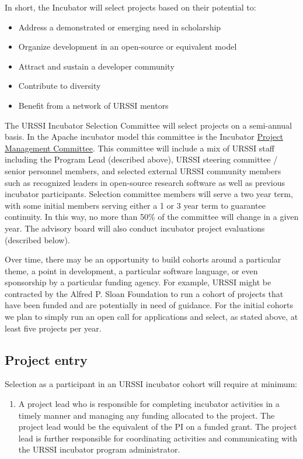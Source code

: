 \documentclass[
]{book}
\providecommand{\tightlist}{%
  \setlength{\itemsep}{0pt}\setlength{\parskip}{0pt}}
\begin{document}
In short, the Incubator will select projects based on their potential to:

\begin{itemize}
\tightlist
\item
  Address a demonstrated or emerging need in scholarship
\item
  Organize development in an open-source or equivalent model
\item
  Attract and sustain a developer community
\item
  Contribute to diversity
\item
  Benefit from a network of URSSI mentors
\end{itemize}

The URSSI Incubator Selection Committee will select projects on a semi-annual basis. In the Apache incubator model this committee is the Incubator \href{http://incubator.apache.org/whoweare.html}{Project Management Committee}.
This committee will include a mix of URSSI staff including the Program Lead (described above), URSSI steering committee / senior personnel members, and selected external URSSI community members such as recognized leaders in open-source research software as well as previous incubator participants.
Selection committee members will serve a two year term, with some initial members serving either a 1 or 3 year term to guarantee continuity.
In this way, no more than 50\% of the committee will change in a given year.
The advisory board will also conduct incubator project evaluations (described below).

Over time, there may be an opportunity to build cohorts around a particular theme, a point in development, a particular software language, or even sponsorship by a particular funding agency.
For example, URSSI might be contracted by the Alfred P. Sloan Foundation to run a cohort of projects that have been funded and are potentially in need of guidance.
For the initial cohorts we plan to simply run an open call for applications and select, as stated above, at least five projects per year.

\hypertarget{project-entry}{%
\subsection{Project entry}\label{project-entry}}

Selection as a participant in an URSSI incubator cohort will require at minimum:

\begin{enumerate}
\def\labelenumi{\arabic{enumi}.}
\tightlist
\item
  A project lead who is responsible for completing incubator activities in a timely manner and managing any funding allocated to the project.
  The project lead would be the equivalent of the PI on a funded grant.
  The project lead is further responsible for coordinating activities and communicating with the URSSI incubator program administrator.
\end{enumerate}
\end{document}
